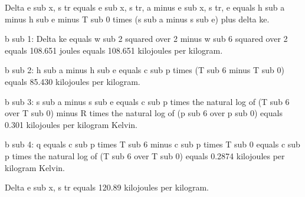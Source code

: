 Delta e sub x, s tr equals e sub x, s tr, a minus e sub x, s tr, e equals h sub a minus h sub e minus T sub 0 times (s sub a minus s sub e) plus delta ke.

b sub 1: Delta ke equals w sub 2 squared over 2 minus w sub 6 squared over 2 equals 108.651 joules equals 108.651 kilojoules per kilogram.

b sub 2: h sub a minus h sub e equals c sub p times (T sub 6 minus T sub 0) equals 85.430 kilojoules per kilogram.

b sub 3: s sub a minus s sub e equals c sub p times the natural log of (T sub 6 over T sub 0) minus R times the natural log of (p sub 6 over p sub 0) equals 0.301 kilojoules per kilogram Kelvin.

b sub 4: q equals c sub p times T sub 6 minus c sub p times T sub 0 equals c sub p times the natural log of (T sub 6 over T sub 0) equals 0.2874 kilojoules per kilogram Kelvin.

Delta e sub x, s tr equals 120.89 kilojoules per kilogram.